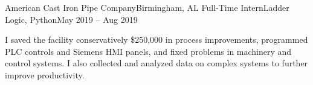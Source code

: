 \Experience
{American Cast Iron Pipe Company}{Birmingham, AL}
{Full-Time Intern}{Ladder Logic, Python}{May 2019 – Aug 2019}

I saved the facility conservatively \$250,000 in process improvements, programmed PLC controls and Siemens HMI panels, and fixed problems in machinery and control systems. I also collected and analyzed data on complex systems to further improve productivity.

